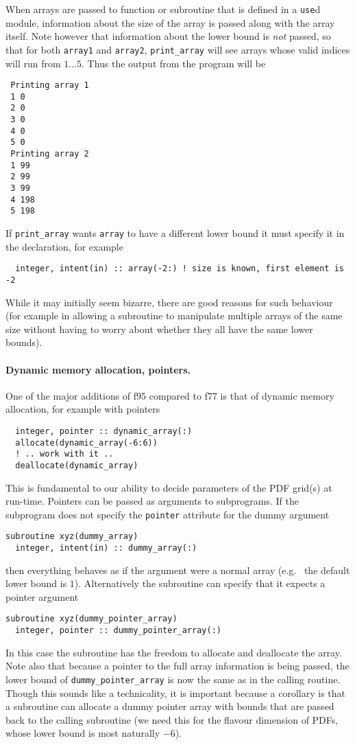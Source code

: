 \documentclass[12pt]{article}
\newcommand{\eg}{e.g.\ }
\begin{document}
When arrays are passed to function or subroutine that is defined in a
\texttt{use}d module, information about the size of the array is
passed along with the array itself. Note however that information
about the lower bound is \emph{not} passed, so that for both
\texttt{array1} and \texttt{array2}, \texttt{print\_array} will see
arrays whose valid indices will run from $1\ldots5$. Thus the output
from the program will be
\begin{lstlisting}
 Printing array 1
 1 0
 2 0
 3 0
 4 0
 5 0
 Printing array 2
 1 99
 2 99
 3 99
 4 198
 5 198
\end{lstlisting}
If \texttt{print\_array} wants \texttt{array} to have a different lower
bound it must specify it in the declaration, for example
\begin{lstlisting}
  integer, intent(in) :: array(-2:) ! size is known, first element is -2
\end{lstlisting}
While it may initially seem bizarre, there are good reasons for such
behaviour (for example in allowing a subroutine to manipulate multiple
arrays of the same size without having to worry about whether they all
have the same lower bounds).

\paragraph{Dynamic memory allocation, pointers.} One of the major
additions of f95 compared to f77 is that of dynamic memory allocation,
for example with pointers
\begin{lstlisting}
  integer, pointer :: dynamic_array(:)
  allocate(dynamic_array(-6:6))
  ! .. work with it ..
  deallocate(dynamic_array)
\end{lstlisting}
This is fundamental to our ability to decide parameters of the PDF
grid(s) at run-time. Pointers can be passed as arguments to subprograms.
If the subprogram does not specify the \texttt{pointer} attribute for
the dummy argument
\begin{lstlisting}
subroutine xyz(dummy_array)
  integer, intent(in) :: dummy_array(:)
\end{lstlisting}
then everything behaves as if the argument were a normal array (\eg
the default lower bound is $1$). Alternatively the subroutine can
specify that it expects a pointer argument
\begin{lstlisting}
subroutine xyz(dummy_pointer_array)
  integer, pointer :: dummy_pointer_array(:)
\end{lstlisting}
In this case the subroutine has the freedom to allocate and deallocate
the array. Note also that because a pointer to the full array
information is being passed, the lower bound of \texttt{dummy\_pointer\_array}
is now the same as in the calling routine. Though this sounds like a
technicality, it is important because a corollary is that a subroutine
can allocate a dummy pointer array with bounds that are passed back to
the calling subroutine (we need this for the flavour dimension of
PDFs, whose lower bound is most naturally $-6$). 
\end{document}
